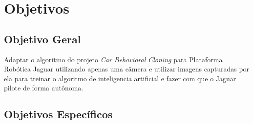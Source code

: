 	\begin{figure}[H]
		\centering
\end{figure}

\section{Objetivos}
\label{sec:objetivos}

\subsection{Objetivo Geral}
\label{sec:objetivo-geral}

Adaptar o algoritmo do projeto \textit{Car Behavioral Cloning} para Plataforma Robótica Jaguar utilizando apenas uma câmera e utilizar imagens capturadas por ela para treinar o algoritmo de inteligencia artificial e fazer com que o Jaguar pilote de forma autônoma.


\subsection{Objetivos Específicos}
\label{sec:objetivos-especificos}

